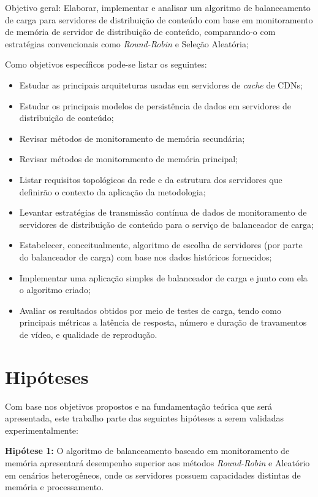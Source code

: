 Objetivo geral: Elaborar, implementar e analisar um algoritmo de balanceamento de carga para servidores de distribuição de conteúdo com base em monitoramento de memória de servidor de distribuição de conteúdo, comparando-o com estratégias convencionais como \textit{Round-Robin} e Seleção Aleatória;

Como objetivos específicos pode-se listar os seguintes:

\begin{itemize}
    \item Estudar as principais arquiteturas usadas em servidores de \textit{cache} de CDNs;
    \item Estudar os principais modelos de persistência de dados em servidores de distribuição de conteúdo;
    \item Revisar métodos de monitoramento de memória secundária;
    \item Revisar métodos de monitoramento de memória principal;
    \item Listar requisitos topológicos da rede e da estrutura dos servidores que definirão o contexto da aplicação da metodologia;
    \item Levantar estratégias de transmissão contínua de dados de monitoramento de servidores de distribuição de conteúdo para o serviço de balanceador de carga;
    \item Estabelecer, conceitualmente, algoritmo de escolha de servidores (por parte do balanceador de carga) com base nos dados históricos fornecidos;
    \item Implementar uma aplicação simples de balanceador de carga e junto com ela o algoritmo criado;
    \item Avaliar os resultados obtidos por meio de testes de carga, tendo como principais métricas a latência de resposta, número e duração de travamentos de vídeo, e qualidade de reprodução.
\end{itemize}

\section{Hipóteses}

Com base nos objetivos propostos e na fundamentação teórica que será apresentada, este trabalho parte das seguintes hipóteses a serem validadas experimentalmente:

\textbf{Hipótese 1:} O algoritmo de balanceamento baseado em monitoramento de memória apresentará desempenho superior aos métodos \textit{Round-Robin} e Aleatório em cenários heterogêneos, onde os servidores possuem capacidades distintas de memória e processamento.

